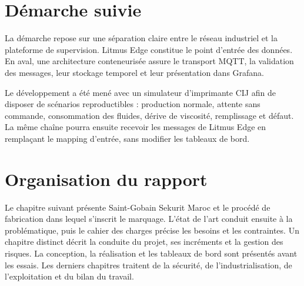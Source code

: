\section{Démarche suivie}

La démarche repose sur une séparation claire entre le réseau industriel et la
plateforme de supervision. Litmus Edge constitue le point d'entrée des données.
En aval, une architecture conteneurisée assure le transport MQTT, la validation
des messages, leur stockage temporel et leur présentation dans Grafana.

Le développement a été mené avec un simulateur d'imprimante CIJ afin de disposer
de scénarios reproductibles : production normale, attente sans commande,
consommation des fluides, dérive de viscosité, remplissage et défaut. La même
chaîne pourra ensuite recevoir les messages de Litmus Edge en remplaçant le
mapping d'entrée, sans modifier les tableaux de bord.

\section{Organisation du rapport}

Le chapitre suivant présente Saint-Gobain Sekurit Maroc et le procédé de
fabrication dans lequel s'inscrit le marquage. L'état de l'art conduit ensuite
à la problématique, puis le cahier des charges précise les besoins et les
contraintes. Un chapitre distinct décrit la conduite du projet, ses incréments
et la gestion des risques. La conception, la réalisation et les tableaux de
bord sont présentés avant les essais. Les derniers chapitres traitent de la
sécurité, de l'industrialisation, de l'exploitation et du bilan du travail.

